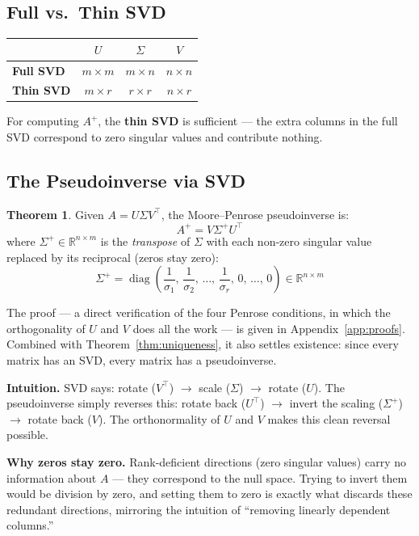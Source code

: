 \documentclass[12pt, a4paper]{article}
\theoremstyle{definition}
\newtheorem{theorem}{Theorem}
\begin{document}
\subsection{Full vs.\ Thin SVD}

\begin{center}
\renewcommand{\arraystretch}{1.4}
\begin{tabular}{lccc}
    \toprule
    & $U$ & $\Sigma$ & $V$ \\
    \midrule
    \textbf{Full SVD} & $m \times m$ & $m \times n$ & $n \times n$ \\
    \textbf{Thin SVD} & $m \times r$ & $r \times r$ & $n \times r$ \\
    \bottomrule
\end{tabular}
\end{center}

For computing $A^+$, the \textbf{thin SVD} is sufficient — the extra columns in the full SVD correspond to zero singular values and contribute nothing.

\subsection{The Pseudoinverse via SVD}

\begin{theorem}
\label{thm:svd}
Given $A = U\Sigma V^\top$, the Moore--Penrose pseudoinverse is:
\[
    \boxed{A^+ = V \Sigma^+ U^\top}
\]
where $\Sigma^+ \in \mathbb{R}^{n \times m}$ is the \emph{transpose} of $\Sigma$ with each non-zero singular value replaced by its reciprocal (zeros stay zero):
\[
    \Sigma^+ = \operatorname{diag}\!\left(\frac{1}{\sigma_1},\, \frac{1}{\sigma_2},\, \ldots,\, \frac{1}{\sigma_r},\, 0,\, \ldots,\, 0\right) \in \mathbb{R}^{n \times m}
\]
\end{theorem}

The proof — a direct verification of the four Penrose conditions, in which the orthogonality of $U$ and $V$ does all the work — is given in Appendix~\ref{app:proofs}. Combined with Theorem~\ref{thm:uniqueness}, it also settles existence: since every matrix has an SVD, every matrix has a pseudoinverse.

\textbf{Intuition.} SVD says: rotate ($V^\top$) $\to$ scale ($\Sigma$) $\to$ rotate ($U$). The pseudoinverse simply reverses this: rotate back ($U^\top$) $\to$ invert the scaling ($\Sigma^+$) $\to$ rotate back ($V$). The orthonormality of $U$ and $V$ makes this clean reversal possible.

\textbf{Why zeros stay zero.} Rank-deficient directions (zero singular values) carry no information about $A$ — they correspond to the null space. Trying to invert them would be division by zero, and setting them to zero is exactly what discards these redundant directions, mirroring the intuition of ``removing linearly dependent columns.''
\end{document}
